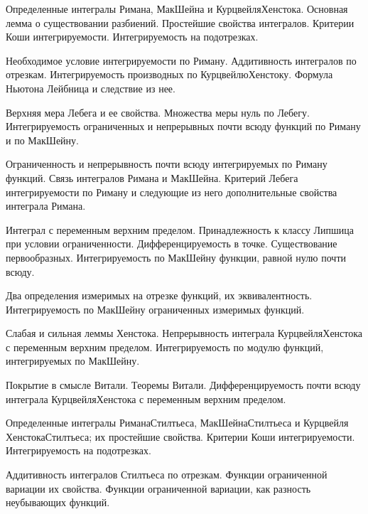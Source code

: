 \documentclass[a4paper]{article}
\begin{document}
\begin{nums}{-2}
\item Определенные интегралы Римана, Мак\д Шейна и Курцвейля\ч Хенстока. Основная лемма
о существовании разбиений. Простейшие свойства интегралов. Критерии Коши интегрируемости.
Интегрируемость на подотрезках.

\item Необходимое условие интегрируемости по Риману. Аддитивность интегралов по отрезкам.
Интегрируемость производных по Курцвейлю\ч Хенстоку. Формула Ньютона\ч
Лейбница и следствие из нее.

\item Верхняя мера Лебега и ее свойства. Множества меры нуль по Лебегу. Интегрируемость
ограниченных и непрерывных почти всюду функций по Риману и по Мак\д Шейну.

\item Ограниченность и непрерывность почти всюду интегрируемых по Риману функций.
Связь интегралов Римана и Мак\д Шейна. Критерий Лебега интегрируемости по Риману
и следующие из него дополнительные свойства интеграла Римана.

\item Интеграл с переменным верхним пределом. Принадлежность к классу Липшица при
условии ограниченности. Дифференцируемость в точке. Существование первообразных.
Интегрируемость по Мак\д Шейну функции, равной нулю почти всюду.

\item Два определения измеримых на отрезке функций, их эквивалентность. Интегрируемость
по Мак\д Шейну ограниченных измеримых функций.

\item Слабая и сильная леммы Хенстока. Непрерывность интеграла Курцвейля\д Хенстока с
переменным верхним пределом. Интегрируемость по модулю функций, интегрируемых
по Мак\д Шейну.

\item Покрытие в смысле Витали. Теоремы Витали. Дифференцируемость почти всюду интеграла
Курцвейля\д Хенстока с переменным верхним пределом.

\item Определенные интегралы Римана\ч Стилтьеса, Мак\д Шейна\ч Стилтьеса и Курцвейля\ч
Хенстока\ч Стилтьеса; их простейшие свойства. Критерии Коши интегрируемости. Интегрируемость
на подотрезках.

\item Аддитивность интегралов Стилтьеса по отрезкам. Функции ограниченной вариации их
свойства. Функции ограниченной вариации, как разность неубывающих функций.


\end{nums}
\end{document}
